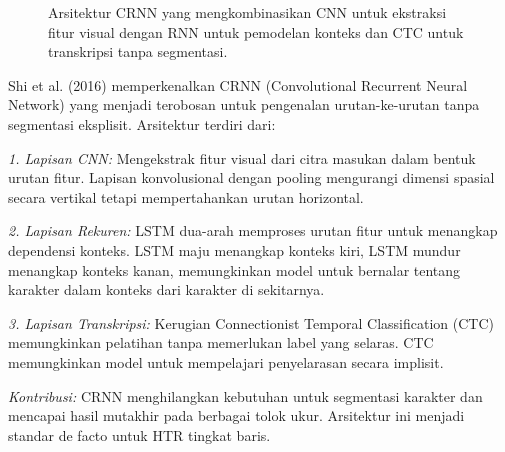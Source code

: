 \documentclass[12pt,a4paper]{article}
\begin{document}
\begin{figure}[H]
\centering
\caption{Arsitektur CRNN yang mengkombinasikan CNN untuk ekstraksi fitur visual dengan RNN untuk pemodelan konteks dan CTC untuk transkripsi tanpa segmentasi.}
\label{fig:crnn-architecture}
\end{figure}

Shi et al. (2016) memperkenalkan CRNN (Convolutional Recurrent Neural Network) yang menjadi terobosan untuk pengenalan urutan-ke-urutan tanpa segmentasi eksplisit. Arsitektur terdiri dari:

\textit{1. Lapisan CNN:} Mengekstrak fitur visual dari citra masukan dalam bentuk urutan fitur. Lapisan konvolusional dengan pooling mengurangi dimensi spasial secara vertikal tetapi mempertahankan urutan horizontal.

\textit{2. Lapisan Rekuren:} LSTM dua-arah memproses urutan fitur untuk menangkap dependensi konteks. LSTM maju menangkap konteks kiri, LSTM mundur menangkap konteks kanan, memungkinkan model untuk bernalar tentang karakter dalam konteks dari karakter di sekitarnya.

\textit{3. Lapisan Transkripsi:} Kerugian Connectionist Temporal Classification (CTC) memungkinkan pelatihan tanpa memerlukan label yang selaras. CTC memungkinkan model untuk mempelajari penyelarasan secara implisit.

\textit{Kontribusi:} CRNN menghilangkan kebutuhan untuk segmentasi karakter dan mencapai hasil mutakhir pada berbagai tolok ukur. Arsitektur ini menjadi standar de facto untuk HTR tingkat baris.
\end{document}
